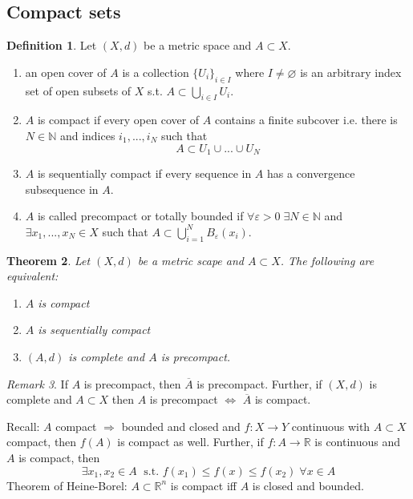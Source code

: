 \documentclass[a4paper, 12pt]{article}
\theoremstyle{plain}
\newtheorem{theorem}{Theorem}[subsection] %
\theoremstyle{definition}
\newtheorem{definition}[theorem]{Definition} %
\theoremstyle{lemma}
\theoremstyle{remark}
\newtheorem{remark}[theorem]{Remark}
\theoremstyle{corollary}
\theoremstyle{example}
\begin{document}
	\subsection{Compact sets}
	\begin{definition}
		Let $(X,d)$ be a metric space and $A \subset X$. 
		\begin{enumerate}
			\item an open cover of $A$ is a collection $\{U_i\}_{i \in I}$ where $I\neq \varnothing$ is an arbitrary index set of open subsets of $X$ s.t. $A \subset \bigcup\limits_{i \in I} U_i$.
			\item $A$ is compact if every open cover of $A$ contains a finite subcover i.e. there is $N \in \mathbb{N}$ and indices $i_1,...,i_N$ such that \[A \subset U_1 \cup ... \cup U_N\]
			\item $A$ is sequentially compact if every sequence in $A$ has a convergence subsequence in $A$.
			\item $A$ is called precompact or totally bounded if $\forall \varepsilon > 0 \; \exists N \in \mathbb{N}$ and $\exists x_1,...,x_N \in X$ such that $A \subset \bigcup_{i = 1}^N B_\varepsilon(x_i)$.
		\end{enumerate}
	\end{definition}
	
	\begin{theorem}
		Let $(X,d)$ be a metric scape and $A \subset X$. The following are equivalent:
		\begin{enumerate}
			\item $A$ is compact
			\item $A$ is sequentially compact
			\item $(A,d)$ is complete and $A$ is precompact.
		\end{enumerate}
	\end{theorem}
	
	\begin{remark}
		If $A$ is precompact, then $\overline{A}$ is precompact. Further, if $(X,d)$ is complete and $A\subset X$ then $A$ is precompact $\Leftrightarrow$ $\overline{A}$ is compact.
	\end{remark}
	
	Recall: $A$ compact $\Rightarrow$ bounded and closed and $f: X \to Y$ continuous with $A \subset X$ compact, then $f(A)$ is compact as well. Further, if $f:A \to \mathbb{R}$ is continuous and $A$ is compact, then \[\exists x_1, x_2 \in A \; \text{ s.t. } f(x_1) \leq f(x) \leq f(x_2) \; \forall x \in A\]
	Theorem of Heine-Borel: $A \subset \mathbb{R}^n$ is compact iff $A$ is closed and bounded.
\end{document}
